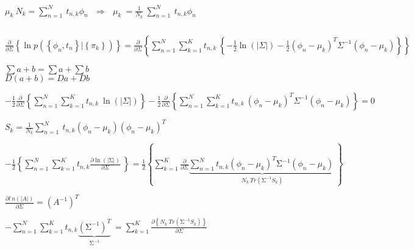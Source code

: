 \documentclass{article}
\begin{document}
$ \displaystyle
    \mu_k\ N_k=\sum_{n=1}^{N}{\ t_{n,k}\phi_n}\ \ \ \Longrightarrow\ \ \ \mu_k\ =\frac{1}{N_k}\ \sum_{n=1}^{N}{\ t_{n,k}\phi_n}\ 
$

\begin{center}
    $  $
\end{center}

$ \displaystyle
    \frac{\partial}{\partial\Sigma}\left\{\ln{p\left(\left\{\phi_n,t_n\right\}|\left\{\pi_k\right\}\right)}\right\}=\frac{\partial}{\partial\Sigma}\left\{\sum_{n=1}^{N}\sum_{k=1}^{K}{t_{n,k}\ \left\{-\frac{1}{2}\ln{\left(\left|\Sigma\right|\right)}-\frac{1}{2}\left(\phi_n-\mu_k\right)^T\Sigma^{-1}\left(\phi_n-\mu_k\right)\right\}}\right\}
$

\begin{center}
    $\displaystyle \sum{a+b}=\sum a+\sum b $ \\
    $\displaystyle D\left(a+b\right)=Da+Db $
\end{center}

$ \displaystyle
    -\frac{1}{2}\frac{\partial}{\partial\Sigma}\left\{\sum_{n=1}^{N}\sum_{k=1}^{K}{t_{n,k}\ \ln{\left(\left|\Sigma\right|\right)}}\right\}-\frac{1}{2}\frac{\partial}{\partial\Sigma}\left\{\sum_{n=1}^{N}\sum_{k=1}^{K}{t_{n,k}\ \left(\phi_n-\mu_k\right)^T\Sigma^{-1}\left(\phi_n-\mu_k\right)}\right\}=0
$

\begin{center}
    $ \displaystyle S_k=\frac{1}{N_k}\sum_{n=1}^{N}{\ t_{n,k}\left(\phi_n-\mu_k\right)\left(\phi_n-\mu_k\right)^T} $
\end{center}

$ \displaystyle
    -\frac{1}{2}\left\{\sum_{n=1}^{N}\sum_{k=1}^{K}{t_{n,k}\frac{\partial \ln {\left(\left|\mathrm{\Sigma}\right|\right)}}{\partial\Sigma}\ }\right\}=\frac{1}{2}
    \left\{
        \sum_{k=1}^{K}{
            \frac{\partial}{\partial\Sigma}{
                \underbrace{\sum_{n=1}^{N}{t_{n,k}\left(\phi_n-\mu_k\right)^T\mathrm{\Sigma}^{-1}\left(\phi_n-\mu_k\right)\ }}_{N_k\ Tr\left(\mathrm{\Sigma}^{-1}S_k\right)}}
        }
    \right\}
$

\begin{center}
    $\displaystyle \frac{\partial l\ n{\left(\left|A\right|\right)}}{\partial\Sigma}=\left(A^{-1}\right)^T $
\end{center}

$ \displaystyle
    -\sum_{n=1}^{N}{
        \sum_{k=1}^{K}{
            t_{n,k}{\underbrace{\left(\mathrm{\Sigma}^{-1}\right)^T}_{\mathrm{\Sigma}^{-1}}}\ 
        }
    }=\sum_{k=1}^{K}{
        \frac{\partial\left\{N_k\ Tr\left(\mathrm{\Sigma}^{-1}S_k\right)\right\}}{\partial\Sigma}
    }
$
\end{document}
